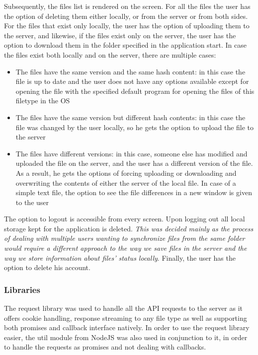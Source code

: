 \documentclass[11pt]{article}
\begin{document}
Subsequently, the files list is rendered on the screen. For all the files the user has the option of deleting them either locally, or from the server or from both sides. For the files that exist only locally, the user has the option of uploading them to the server, and likewise, if the files exist only on the server, the user has the option to download them in the folder specified in the application start. In case the files exist both locally and on the server, there are multiple cases:

\begin{itemize}
	\item{The files have the same version and the same hash content: in this case the file is up to date and the user does not have any options available except for opening the file with the specified default program for opening the files of this filetype in the OS}
	\item{The files have the same version but different hash contents:  in this case the file was changed by the user locally, so he gets the option to upload the file to the server}
	\item{The files have different versions: in this case, someone else has modified and uploaded the file on the server, and the user has a different version of the file. As a result, he gets the options of forcing uploading or downloading and overwriting the contents of either the server of the local file. In case of a simple text file, the option to see the file differences in a new window is given to the user}
\end{itemize}

The option to logout is accessible from every screen. Upon logging out all local storage kept for the application is deleted. \emph{This was decided mainly as the process of dealing with multiple users wanting to synchronize files from the same folder would require a different approach to the way we save files in the server and the way we store information about files’ status locally}. Finally, the user has the option to delete his account.

\subsubsection*{Libraries}

The request library \cite{request:19} was used to handle all the API requests to the server as it offers cookie handling, response streaming to any file type as well as supporting both promises and callback interface natively. In order to use the request library easier, the util module from NodeJS was also used in conjunction to it, in order to handle the requests as promises and not dealing with callbacks.
\end{document}
